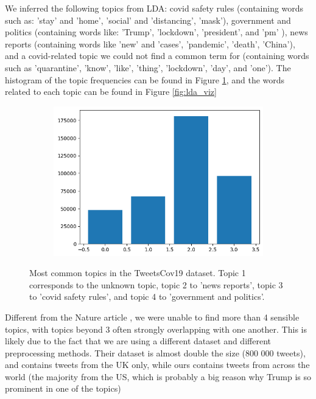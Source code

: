 We inferred the following topics from LDA: covid safety rules (containing words such as: 'stay' and 'home', 'social' and 'distancing', 'mask'), government and politics (containing words like: 'Trump', 'lockdown', 'president', and 'pm' ), news reports (containing words like 'new' and 'cases', 'pandemic', 'death', 'China'), and a covid-related topic we could not find a common term for (containing words such as 'quarantine', 'know', 'like', 'thing', 'lockdown', 'day', and 'one'). The histogram of the topic frequencies can be found in Figure \ref{fig:lda_histo}, and the words related to each topic can be found in Figure \ref{fig:lda_viz}

\begin{figure}
 \centering
 \begin{subfigure}{0.5\columnwidth}
 \includegraphics[width=1\textwidth]{images/LDA_topics.png}
 \end{subfigure}
 \caption{Most common topics in the TweetsCov19 dataset. Topic 1 corresponds to the unknown topic, topic 2 to 'news reports', topic 3 to 'covid safety rules', and topic 4 to 'government and politics'.}
 \label{fig:lda_histo}
\end{figure}


Different from the Nature article \cite{ldaUK}, we were unable to find more than 4 sensible topics, with topics beyond 3 often strongly overlapping with one another. This is likely due to the fact that we are using a different dataset and different preprocessing methods. Their dataset is almost double the size (800 000 tweets), and contains tweets from the UK only, while ours contains tweets from across the world (the majority from the US, which is probably a big reason why Trump is so prominent in one of the topics)


